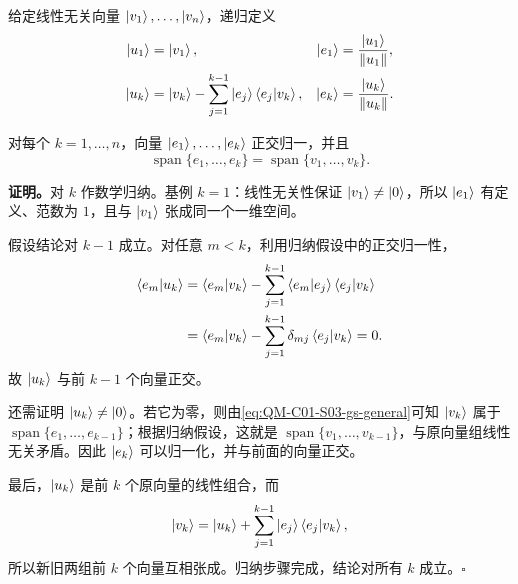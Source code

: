 
给定线性无关向量 $\left|v_1\right\rangle,\ldots,\left|v_n\right\rangle$，递归定义
\begin{align}
  \left|u_1\right\rangle&=\left|v_1\right\rangle,
  &\left|e_1\right\rangle&=\frac{\left|u_1\right\rangle}{\left\lVert u_1 \right\rVert},
  \label{eq:QM-C01-S03-gs-first}\\
  \left|u_k\right\rangle
  &=\left|v_k\right\rangle-\sum_{j=1}^{k-1}\left|e_j\right\rangle\left\langle e_j \middle| v_k \right\rangle,
  &\left|e_k\right\rangle&=\frac{\left|u_k\right\rangle}{\left\lVert u_k \right\rVert}.
  \label{eq:QM-C01-S03-gs-general}
\end{align}

\begin{theorem}
对每个 $k=1,\ldots,n$，向量 $\left|e_1\right\rangle,\ldots,\left|e_k\right\rangle$ 正交归一，并且
\[
  \operatorname{span}\{e_1,\ldots,e_k\}
  =\operatorname{span}\{v_1,\ldots,v_k\}.
\]
\end{theorem}

\textbf{证明。}对 $k$ 作数学归纳。基例 $k=1$：线性无关性保证 $\left|v_1\right\rangle\neq\left|0\right\rangle$，所以 $\left|e_1\right\rangle$ 有定义、范数为 $1$，且与 $\left|v_1\right\rangle$ 张成同一个一维空间。

假设结论对 $k-1$ 成立。对任意 $m<k$，利用归纳假设中的正交归一性，
\begin{align*}
  \left\langle e_m \middle| u_k \right\rangle
  &=\left\langle e_m \middle| v_k \right\rangle
    -\sum_{j=1}^{k-1}\left\langle e_m \middle| e_j \right\rangle\left\langle e_j \middle| v_k \right\rangle\\
  &=\left\langle e_m \middle| v_k \right\rangle
    -\sum_{j=1}^{k-1}\delta_{mj}\left\langle e_j \middle| v_k \right\rangle=0.
\end{align*}
故 $\left|u_k\right\rangle$ 与前 $k-1$ 个向量正交。

还需证明 $\left|u_k\right\rangle\neq\left|0\right\rangle$。若它为零，则由\cref{eq:QM-C01-S03-gs-general}可知 $\left|v_k\right\rangle$ 属于 $\operatorname{span}\{e_1,\ldots,e_{k-1}\}$；根据归纳假设，这就是 $\operatorname{span}\{v_1,\ldots,v_{k-1}\}$，与原向量组线性无关矛盾。因此 $\left|e_k\right\rangle$ 可以归一化，并与前面的向量正交。

最后，$\left|u_k\right\rangle$ 是前 $k$ 个原向量的线性组合，而
\[
  \left|v_k\right\rangle=\left|u_k\right\rangle
  +\sum_{j=1}^{k-1}\left|e_j\right\rangle\left\langle e_j \middle| v_k \right\rangle,
\]
所以新旧两组前 $k$ 个向量互相张成。归纳步骤完成，结论对所有 $k$ 成立。\hfill$\square$


